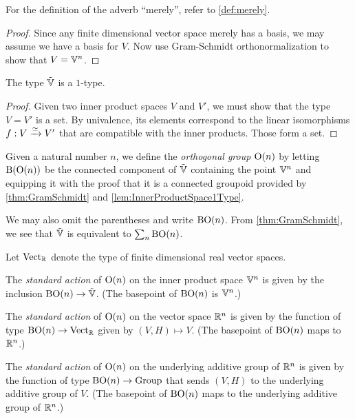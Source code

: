 For the definition of the adverb ``merely'', refer to \cref{def:merely}.

\begin{proof}
  Since any finite dimensional vector space merely has a basis, we may assume
  we have a basis for $V$.  Now use Gram-Schmidt orthonormalization to show
  that $V = \mathbb V^n$.
\end{proof}

\begin{lemma}\label{lem:InnerProductSpace1Type}
  The type ${\tilde {\mathbb V}}$ is a $1$-type.
\end{lemma}

\begin{proof}
  Given two inner product spaces $V$ and $V'$, we must show that the type
  $V=V'$ is a set.  By univalence, its elements correspond to the linear
  isomorphisms $f : V \xrightarrow {\simeq} V'$ that are compatible with the
  inner products.  Those form a set.
\end{proof}

\begin{definition}\label{def:OrthogonalGroup}
  Given a natural number $n$, we define the {\em orthogonal group} $\mathrm{O}(n)$
  by letting $\mathrm{B} (\mathrm{O}(n))$ be the connected component of ${\tilde {\mathbb V}}$ containing
  the point $\mathbb V^n$ and equipping it with the proof that it is a connected
  groupoid provided by \cref{thm:GramSchmidt} and
  \cref{lem:InnerProductSpace1Type}.
\end{definition}

We may also omit the parentheses and write $\mathrm{B}\mathrm{O}(n)$.
From \cref{thm:GramSchmidt}, we see that ${\tilde {\mathbb V}}$ is equivalent to $\sum_n \mathrm{B} \mathrm{O}(n)$.

Let $\mathrm{Vect}_{\mathbb{R}}$ denote the type of finite dimensional real vector spaces.

\begin{definition}\label{def:OrthogonalGroupStandardAction}
  The {\em standard action} of $\mathrm{O}(n)$ on the inner product space $\mathbb V^n$ is given
  by the inclusion $\mathrm{B} \mathrm{O}(n) \to {\tilde {\mathbb V}}$.
  (The basepoint of $\mathrm{B} \mathrm{O}(n)$ is $\mathbb V^n$.)

  The {\em standard action} of $\mathrm{O}(n)$ on the vector space $\mathbb{R}^n$ is given
  by the function of type $\mathrm{B} \mathrm{O}(n) \to \mathrm{Vect}_{\mathbb{R}}$ given by
  $(V,H) \mapsto V$.
  (The basepoint of $\mathrm{B} \mathrm{O}(n)$ maps to $\mathbb{R}^n$.)

  The {\em standard action} of $\mathrm{O}(n)$ on the underlying additive group of $\mathbb{R}^n$ is given
  by the function of type $\mathrm{B} \mathrm{O}(n) \to \mathrm{Group}$ that sends
  $(V,H)$ to the underlying additive group of $V$.
  (The basepoint of $\mathrm{B} \mathrm{O}(n)$ maps to the underlying additive group of $\mathbb{R}^n$.)
\end{definition}
  
